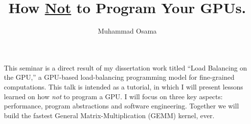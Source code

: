 \documentclass[12pt]{amsart}
\title{How \underline{Not} to Program Your GPUs.}
\author{Muhammad Osama}
\begin{document}
\maketitle	

This seminar is a direct result of my dissertation work titled ``Load Balancing on the GPU,'' a GPU-based load-balancing programming model for fine-grained computations. This talk is intended as a tutorial, in which I will present lessons learned on how \emph{not} to program a GPU. I will focus on three key aspects: performance, program abstractions and software engineering. Together we will build the fastest General Matrix-Multiplication (GEMM) kernel, ever.

\end{document}
